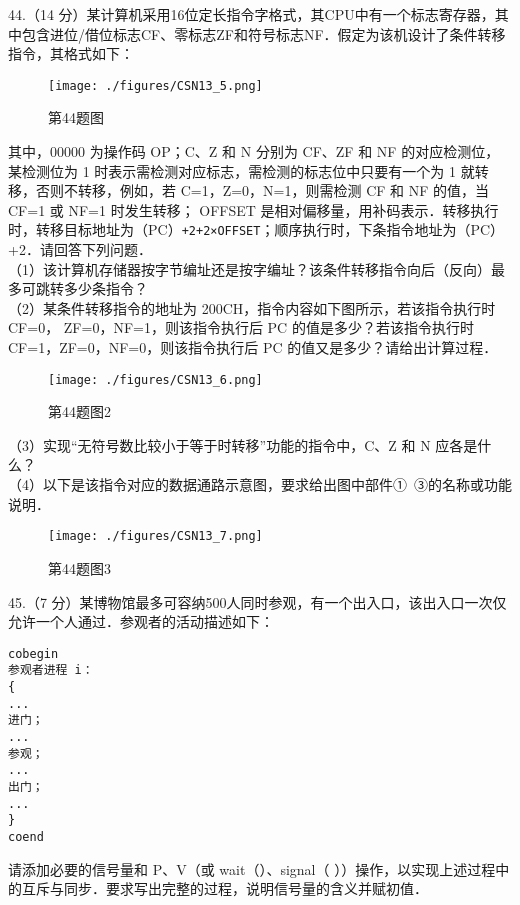 44.（14 分）某计算机采用16位定长指令字格式，其CPU中有一个标志寄存器，其中包含进位/借位标志CF、零标志ZF和符号标志NF．假定为该机设计了条件转移指令，其格式如下：
\begin{figure}[ht]
\centering
\texttt{[image: ./figures/CSN13\_5.png]}
\caption{第44题图} \label{CSN13_fig5}
\end{figure}
 其中，00000 为操作码 OP；C、Z 和 N 分别为 CF、ZF 和 NF 的对应检测位，某检测位为 1 时表示需检测对应标志，需检测的标志位中只要有一个为 1 就转移，否则不转移，例如，若 C=1，Z=0，N=1，则需检测 CF 和 NF 的值，当 CF=1 或 NF=1 时发生转移； OFFSET 是相对偏移量，用补码表示．转移执行时，转移目标地址为（PC）\verb|+2+2×OFFSET|；顺序执行时，下条指令地址为（PC）+2．请回答下列问题．  \\
（1）该计算机存储器按字节编址还是按字编址？该条件转移指令向后（反向）最多可跳转多少条指令？ \\
（2）某条件转移指令的地址为 200CH，指令内容如下图所示，若该指令执行时 CF=0， ZF=0，NF=1，则该指令执行后 PC 的值是多少？若该指令执行时 CF=1，ZF=0，NF=0，则该指令执行后 PC 的值又是多少？请给出计算过程． \\
\begin{figure}[ht]
\centering
\texttt{[image: ./figures/CSN13\_6.png]}
\caption{第44题图2} \label{CSN13_fig6}
\end{figure}
（3）实现“无符号数比较小于等于时转移”功能的指令中，C、Z 和 N 应各是什么？  \\
（4）以下是该指令对应的数据通路示意图，要求给出图中部件①~③的名称或功能说明．  \\
\begin{figure}[ht]
\centering
\texttt{[image: ./figures/CSN13\_7.png]}
\caption{第44题图3} \label{CSN13_fig7}
\end{figure}

45.（7 分）某博物馆最多可容纳500人同时参观，有一个出入口，该出入口一次仅允许一个人通过．参观者的活动描述如下：    
\begin{lstlisting}[language=none]
cobegin 
参观者进程 i： 
{ 
...
进门；
...
参观；
...
出门；
...
}
coend 
\end{lstlisting}
请添加必要的信号量和 P、V（或 wait（）、signal（ ））操作，以实现上述过程中的互斥与同步．要求写出完整的过程，说明信号量的含义并赋初值．

